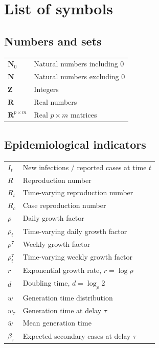 \newlength{\symcolwidth}\setlength{\symcolwidth}{16em}

\chapter*{List of symbols}

\section*{Numbers and sets}
\noindent
\begin{tabular}{@{} p{\symcolwidth} p{\dimexpr\linewidth-\symcolwidth-2\tabcolsep\relax} @{}}
$\mathbf{N}_0$           & Natural numbers including $0$ \\
$\mathbf{N}$             & Natural numbers excluding $0$ \\
$\mathbf{Z}$             & Integers \\
$\mathbf{R}$             & Real numbers \\
$\mathbf{R}^{p\times m}$ & Real $p \times m$ matrices \\
\end{tabular}

\section*{Epidemiological indicators}
\noindent
\begin{tabular}{@{} p{\symcolwidth} p{\dimexpr\linewidth-\symcolwidth-2\tabcolsep\relax} @{}}
$I_t$        & New infections / reported cases at time $t$ \\
$R$          & Reproduction number \\
$R_t$        & Time-varying reproduction number \\
$R_c$        & Case reproduction number \\
$\rho$       & Daily growth factor \\
$\rho_t$     & Time-varying daily growth factor \\
$\rho^{7}$   & Weekly growth factor \\
$\rho^{7}_t$ & Time-varying weekly growth factor \\
$r$          & Exponential growth rate, $r = \log \rho$ \\
$d$          & Doubling time, $d = \log_\rho 2$ \\
$w$          & Generation time distribution \\
$w_\tau$     & Generation time at delay $\tau$ \\
$\bar w$     & Mean generation time \\
$\beta_\tau$ & Expected secondary cases at delay $\tau$ \\
\end{tabular}

